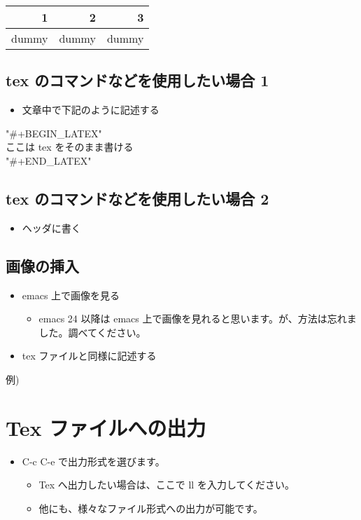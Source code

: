 \documentclass[11pt,a4paper,xdvipdfmx]{article}
\begin{document}
\begin{center}
\begin{tabular}{rrr}
1 & 2 & 3\\
\hline
dummy & dummy & dummy\\
\end{tabular}
\end{center}

\subsection{tex のコマンドなどを使用したい場合 1}
\label{sec-3-3}
\begin{itemize}
\item 文章中で下記のように記述する
\end{itemize}

"\#+BEGIN\_LATEX"\\
ここは tex をそのまま書ける\\
"\#+END\_LATEX"

\subsection{tex のコマンドなどを使用したい場合 2}
\label{sec-3-4}
\begin{itemize}
\item ヘッダに書く
\end{itemize}

\subsection{画像の挿入}
\label{sec-3-5}
\begin{itemize}
\item emacs 上で画像を見る
\begin{itemize}
\item emacs 24 以降は emacs 上で画像を見れると思います。が、方法は忘れま
した。調べてください。
\end{itemize}

\item tex ファイルと同様に記述する
\end{itemize}
例)

\section{Tex ファイルへの出力}
\label{sec-4}
\begin{itemize}
\item C-c C-e で出力形式を選びます。
\begin{itemize}
\item Tex へ出力したい場合は、ここで ll を入力してください。
\item 他にも、様々なファイル形式への出力が可能です。
\end{itemize}
\end{itemize}
\end{document}

